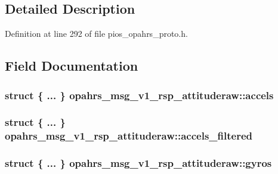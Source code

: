 \subsection{Detailed Description}


Definition at line 292 of file pios\-\_\-opahrs\-\_\-proto.\-h.



\subsection{Field Documentation}
\hypertarget{structopahrs__msg__v1__rsp__attituderaw_a40841cd397066f6e20baf69d3b0bb9e0}{
\subsubsection[{accels}]{\setlength{\rightskip}{0pt plus 5cm}struct \{ ... \}   opahrs\-\_\-msg\-\_\-v1\-\_\-rsp\-\_\-attituderaw\-::accels}}\label{structopahrs__msg__v1__rsp__attituderaw_a40841cd397066f6e20baf69d3b0bb9e0}
\hypertarget{structopahrs__msg__v1__rsp__attituderaw_a37789d2d408e4d88f343a512a68c1ca2}{
\subsubsection[{accels\-\_\-filtered}]{\setlength{\rightskip}{0pt plus 5cm}struct \{ ... \}   opahrs\-\_\-msg\-\_\-v1\-\_\-rsp\-\_\-attituderaw\-::accels\-\_\-filtered}}\label{structopahrs__msg__v1__rsp__attituderaw_a37789d2d408e4d88f343a512a68c1ca2}
\hypertarget{structopahrs__msg__v1__rsp__attituderaw_a9057250436f1515bab5cc0d596e649b0}{
\subsubsection[{gyros}]{\setlength{\rightskip}{0pt plus 5cm}struct \{ ... \}   opahrs\-\_\-msg\-\_\-v1\-\_\-rsp\-\_\-attituderaw\-::gyros}}\label{structopahrs__msg__v1__rsp__attituderaw_a9057250436f1515bab5cc0d596e649b0}
